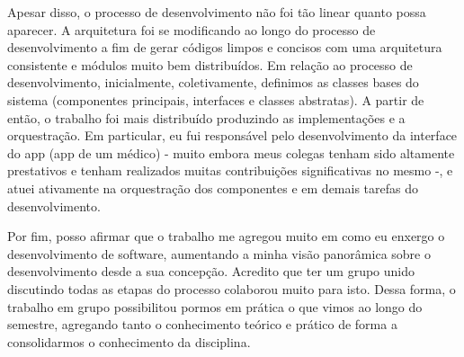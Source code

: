\documentclass[12pt, a4paper]{article}
\newcommand{\sw}{software}
\begin{document}
    Apesar disso, o processo de desenvolvimento não foi tão linear quanto possa aparecer. A arquitetura foi se modificando ao longo do processo de desenvolvimento a fim de gerar códigos limpos e concisos com uma arquitetura consistente e módulos muito bem distribuídos. Em relação ao processo de desenvolvimento, inicialmente, coletivamente, definimos as classes bases do sistema (componentes principais, interfaces e classes abstratas). A partir de então, o trabalho foi mais distribuído produzindo as implementações e a orquestração. Em particular, eu fui responsável pelo desenvolvimento da interface do app (app de um médico) - muito embora meus colegas tenham sido altamente prestativos e tenham realizados muitas contribuições significativas no mesmo -, e atuei ativamente na orquestração dos componentes e em demais tarefas do desenvolvimento.
    
    Por fim, posso afirmar que o trabalho me agregou muito em como eu enxergo o desenvolvimento de \sw, aumentando a minha visão panorâmica sobre o desenvolvimento desde a sua concepção. Acredito que ter um grupo unido discutindo todas as etapas do processo colaborou muito para isto. Dessa forma, o trabalho em grupo possibilitou pormos em prática o que vimos ao longo do semestre, agregando tanto o conhecimento teórico e prático de forma a consolidarmos o conhecimento da disciplina.
    

    
\end{document}

